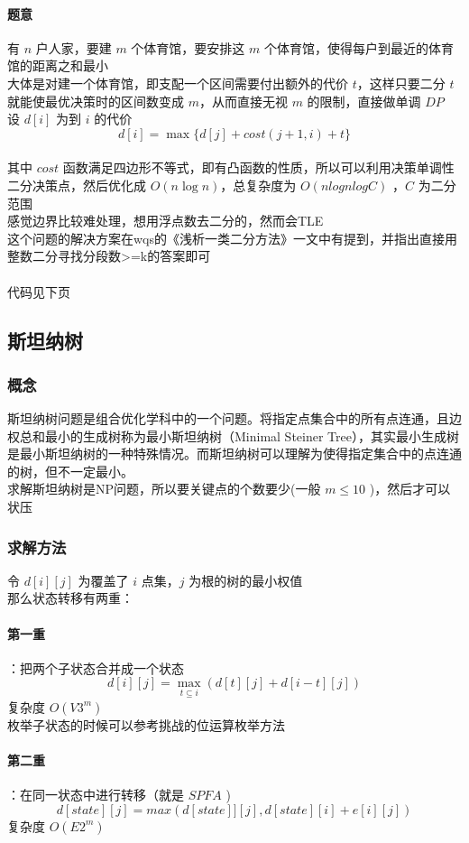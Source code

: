 	\paragraph{题意}有 $n$ 户人家，要建 $m$ 个体育馆，要安排这 $m$ 个体育馆，使得每户到最近的体育馆的距离之和最小\\
	大体是对建一个体育馆，即支配一个区间需要付出额外的代价 $t$，这样只要二分 $t$ 就能使最优决策时的区间数变成 $m$，从而直接无视 $m$ 的限制，直接做单调 $DP$\\
	设 $d[i]$ 为到 $i$ 的代价\\
	$$
	d[i]=\max\{d[j]+cost(j+1,i)+t\}
	$$
	\\其中 $cost$ 函数满足四边形不等式，即有凸函数的性质，所以可以利用决策单调性二分决策点，然后优化成 $O(n\log n)$，总复杂度为 $O(nlognlogC)$ ，$C$ 为二分范围\\
	感觉边界比较难处理，想用浮点数去二分的，然而会TLE\\
	这个问题的解决方案在wqs的《浅析一类二分方法》一文中有提到，并指出直接用整数二分寻找分段数>=k的答案即可\\
	\\
	代码见下页\\
	\newpage
	
	\newpage
	\subsection{斯坦纳树}
	\subsubsection{概念}
	斯坦纳树问题是组合优化学科中的一个问题。将指定点集合中的所有点连通，且边权总和最小的生成树称为最小斯坦纳树（Minimal Steiner Tree），其实最小生成树是最小斯坦纳树的一种特殊情况。而斯坦纳树可以理解为使得指定集合中的点连通的树，但不一定最小。\\
	求解斯坦纳树是NP问题，所以要关键点的个数要少(一般 $m\le 10$ )，然后才可以状压\\
	\subsubsection{求解方法}
	令 $d[i][j]$ 为覆盖了 $i$ 点集，$j$ 为根的树的最小权值\\
	那么状态转移有两重：
	\paragraph{第一重}：把两个子状态合并成一个状态
	$$
	d[i][j]=\max\limits_{t\subseteq i} (d[t][j]+d[i-t][j])
	$$
	复杂度 $O(V3^m)$\\
	枚举子状态的时候可以参考挑战的位运算枚举方法\\
	\paragraph{第二重}：在同一状态中进行转移（就是 $SPFA$ )\\
	$$
	d[state][j]=max(d[state]][j],d[state][i]+e[i][j])
	$$
	复杂度 $O(E2^m)$\\
	\vspace{5.7cm}
	
%	
%